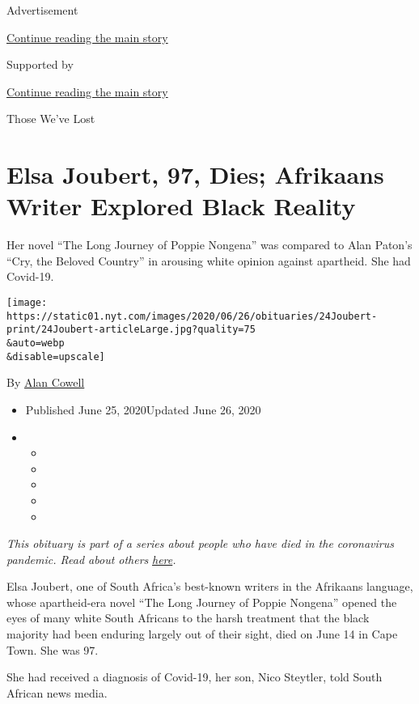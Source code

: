 Advertisement

\protect\hyperlink{after-top}{Continue reading the main story}

Supported by

\protect\hyperlink{after-sponsor}{Continue reading the main story}

Those We've Lost

\hypertarget{elsa-joubert-97-dies-afrikaans-writer-explored-black-reality}{%
\section{Elsa Joubert, 97, Dies; Afrikaans Writer Explored Black
Reality}\label{elsa-joubert-97-dies-afrikaans-writer-explored-black-reality}}

Her novel ``The Long Journey of Poppie Nongena'' was compared to Alan
Paton's ``Cry, the Beloved Country'' in arousing white opinion against
apartheid. She had Covid-19.

\texttt{[image: https://static01.nyt.com/images/2020/06/26/obituaries/24Joubert-print/24Joubert-articleLarge.jpg?quality=75\\\&auto=webp\\\&disable=upscale]}

By \href{https://www.nytimes.com/by/alan-cowell}{Alan Cowell}

\begin{itemize}
\item
  Published June 25, 2020Updated June 26, 2020
\item
  \begin{itemize}
  \item
  \item
  \item
  \item
  \item
  \end{itemize}
\end{itemize}

\emph{This obituary is part of a series about people who have died in
the coronavirus pandemic. Read about others}
\href{https://www.nytimes.com/interactive/2020/obituaries/people-died-coronavirus-obituaries.html}{\emph{here}}\emph{.}

Elsa Joubert, one of South Africa's best-known writers in the Afrikaans
language, whose apartheid-era novel ``The Long Journey of Poppie
Nongena'' opened the eyes of many white South Africans to the harsh
treatment that the black majority had been enduring largely out of their
sight, died on June 14 in Cape Town. She was 97.

She had received a diagnosis of Covid-19, her son, Nico Steytler, told
South African news media.

